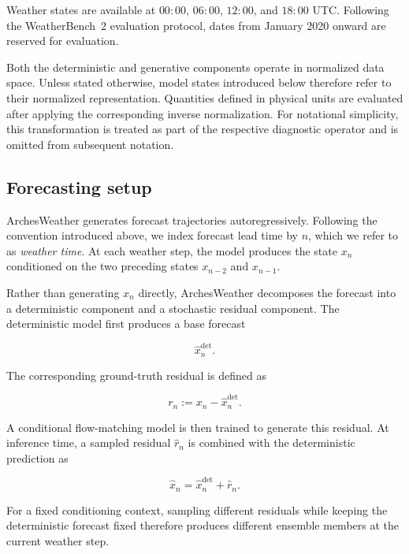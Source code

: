 Weather states are available at $00{:}00$, $06{:}00$, $12{:}00$, and
$18{:}00$ UTC.
Following the WeatherBench~2 evaluation protocol, dates from January 2020
onward are reserved for evaluation.

Both the deterministic and generative components operate in normalized data
space. Unless stated otherwise, model states introduced below therefore refer
to their normalized representation. Quantities defined in physical units are
evaluated after applying the corresponding inverse normalization. For
notational simplicity, this transformation is treated as part of the
respective diagnostic operator and is omitted from subsequent notation.



\subsection{Forecasting setup}

ArchesWeather generates forecast trajectories autoregressively.
Following the convention introduced above, we index forecast lead time by
$n$, which we refer to as \emph{weather time}.
At each weather step, the model produces the state $x_n$ conditioned on the
two preceding states $x_{n-2}$ and $x_{n-1}$.

Rather than generating $x_n$ directly, ArchesWeather decomposes the
forecast into a deterministic component and a stochastic residual component.
The deterministic model first produces a base forecast

\[
    \hat{x}^{\mathrm{det}}_n.
\]

The corresponding ground-truth residual is defined as

\begin{equation}
    r_n
    :=
    x_n
    -
    \hat{x}^{\mathrm{det}}_n.
    \label{eq:arches-residual}
\end{equation}

A conditional flow-matching model is then trained to generate this residual.
At inference time, a sampled residual $\hat r_n$ is combined with the
deterministic prediction as

\begin{equation}
    \hat{x}_n
    =
    \hat{x}^{\mathrm{det}}_n
    +
    \hat{r}_n.
    \label{eq:arches-forecast}
\end{equation}

For a fixed conditioning context, sampling different residuals while keeping
the deterministic forecast fixed therefore produces different ensemble members
at the current weather step.

